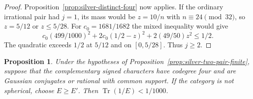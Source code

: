 \documentclass[11pt,reqno]{amsart}
\newtheorem{proposition}[theorem]{Proposition}
\theoremstyle{remark}\newtheorem{remark}[theorem]{Remark}
\numberwithin{equation}{section}
\begin{document}
\begin{proof}
Proposition~\ref{prop:silver-distinct-four} now applies. If the
ordinary irrational pair had $j=1$, its mass would be $z=10/n$
with $n\equiv24\pmod{32}$, so $z=5/12$ or $z\le5/28$.
For $c_0=1681/1682$ the mixed inequality would give
\[
 c_0(499/1000)^2+2c_0(1/2-z)^2+2(49/50)z^2\le1/2.
\]
The quadratic exceeds $1/2$ at $5/12$ and on $[0,5/28]$.
Thus $j\ge2$.
\end{proof}

\begin{proposition}\label{prop:folded-silver-small-mass}
Under the hypotheses of Proposition~\ref{prop:silver-two-pair-finite}, suppose that the complementary signed characters have codegree four and are Gaussian conjugates or rational with common support. If the category is not spherical, choose $E\ge E'$. Then $\operatorname{Tr}(1/E)<1/1000$.
\end{proposition}
\end{document}
